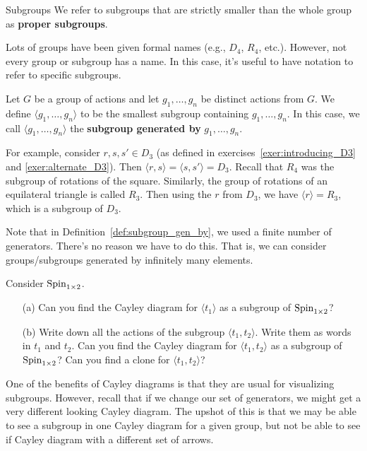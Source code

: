 \begin{section}{Subgroups}
We refer to subgroups that are strictly smaller than the whole group as \textbf{proper subgroups}.

Lots of groups have been given formal names (e.g., $D_4$, $R_4$, etc.).  However, not every group or subgroup has a name.  In this case, it's useful to have notation to refer to specific subgroups.

\begin{definition}\label{def:subgroup_gen_by}
Let $G$ be a group of actions and let $g_1,\ldots, g_n$ be distinct actions from $G$.  We define $\langle g_1,\ldots, g_n\rangle$ to be the smallest subgroup containing $g_1,\ldots, g_n$.  In this case, we call $\langle g_1,\ldots, g_n\rangle$ the \textbf{subgroup generated by} $g_1,\ldots, g_n$.
\end{definition}

For example, consider $r, s, s'\in D_3$ (as defined in exercises~\ref{exer:introducing_D3} and \ref{exer:alternate_D3}).  Then $\langle r,s\rangle=\langle s, s'\rangle=D_3$.  Recall that $R_4$ was the subgroup of rotations of the square.  Similarly, the group of rotations of an equilateral triangle is called $R_3$.  Then using the $r$ from $D_3$, we have $\langle r\rangle = R_3$, which is a subgroup of $D_3$.

Note that in Definition~\ref{def:subgroup_gen_by}, we used a finite number of generators.  There's no reason we have to do this.  That is, we can consider groups/subgroups generated by infinitely many elements.

\begin{exercise}
Consider $\operatorname{Spin}_{1\times 2}$.  
\begin{enumerate}
\item[(a)] Can you find the Cayley diagram for $\langle t_1\rangle$ as a subgroup of $\operatorname{Spin}_{1\times 2}$?
\item[(b)] Write down all the actions of the subgroup $\langle t_1, t_2\rangle$. Write them as words in $t_1$ and $t_2$.  Can you find the Cayley diagram for $\langle t_1, t_2\rangle$ as a subgroup of $\operatorname{Spin}_{1\times 2}$?  Can you find a clone for $\langle t_1, t_2\rangle$?
\end{enumerate}
\end{exercise}

One of the benefits of Cayley diagrams is that they are usual for visualizing subgroups.  However, recall that if we change our set of generators, we might get a very different looking Cayley diagram.  The upshot of this is that we may be able to see a subgroup in one Cayley diagram for a given group, but not be able to see if Cayley diagram with a different set of arrows.


\end{section}
